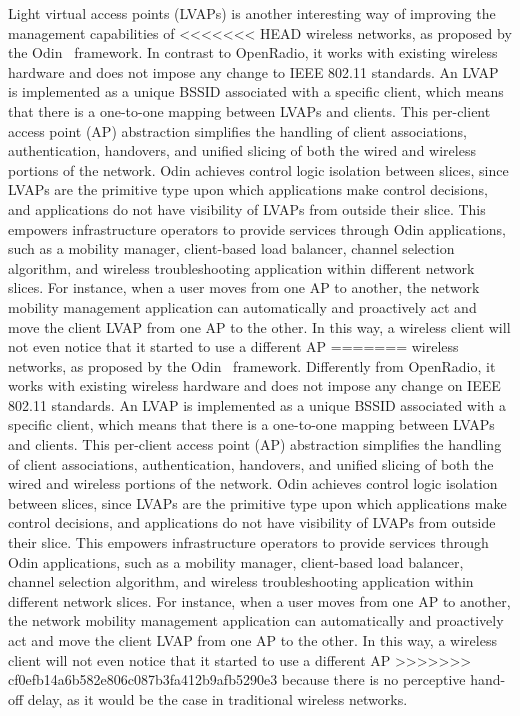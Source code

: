 Light virtual access points (LVAPs) is another interesting way of improving the management capabilities of 
<<<<<<< HEAD
wireless networks, as proposed by the Odin~\cite{schulz-zander2014-atc} framework. 
In contrast to OpenRadio, 
it works with existing wireless hardware and does not impose any change to IEEE 802.11 standards. An LVAP is implemented as a unique BSSID associated with a specific client, which means that there is a one-to-one mapping between LVAPs and clients. This per-client access point (AP) abstraction simplifies the handling of client associations, authentication, handovers, and unified slicing of both the wired and wireless portions of the network. Odin achieves control logic isolation between slices, since LVAPs are the primitive type upon which applications make control decisions, and applications do not have visibility of LVAPs from outside their slice.
 This empowers infrastructure operators to provide services through Odin applications, such as a mobility manager, client-based load balancer, channel selection algorithm, and wireless troubleshooting application within different network slices. For instance, when a user moves from one AP to another, the
 network mobility management application can automatically and proactively act and move the client LVAP from one
AP to the other. In this way, a wireless client will not even notice that it started to use a different AP
=======
wireless networks, as proposed by the Odin~\cite{schulz-zander2014-atc} framework. Differently from OpenRadio, 
it works with existing wireless hardware and does not impose any change on IEEE 802.11 standards. 
An LVAP is implemented as a unique BSSID associated with a specific client, which means that there is a one-to-one mapping 
between LVAPs and clients. This per-client access point (AP) abstraction simplifies the handling of client associations, authentication, handovers, and unified slicing of both the wired and wireless portions of the network. Odin achieves control logic isolation between slices, since LVAPs are the primitive type upon which applications make control decisions, and applications do not have visibility of LVAPs from outside their slice.
This empowers infrastructure operators to provide services through Odin applications, such as a mobility manager, client-based load balancer, channel selection algorithm, and wireless troubleshooting application within different network slices. For instance, when a user moves from one AP to another, the 
network mobility management application can automatically and proactively act and move the client LVAP from one 
AP to the other. In this way, a wireless client will not even notice that it started to use a different AP 
>>>>>>> cf0efb14a6b582e806c087b3fa412b9afb5290e3
because there is no perceptive hand-off delay, as it would be the case in traditional wireless networks.


